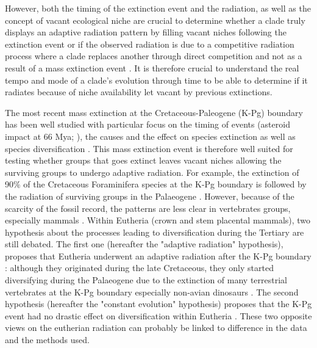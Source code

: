 \documentclass[12pt,letterpaper]{article}
\begin{document}
However, both the timing of the extinction event and the radiation, as well as the concept of vacant ecological niche are crucial to determine whether a clade truly displays an adaptive radiation pattern by filling vacant niches following the extinction event or if the observed radiation is due to a competitive radiation process where a clade replaces another through direct competition and not as a result of a mass extinction event \citep[e.g.][]{Brusatte12092008,bentonmodels2014}. It is therefore crucial to understand the real tempo and mode of a clade's evolution through time to be able to determine if it radiates because of niche availability let vacant by previous extinctions.

The most recent mass extinction at the Cretaceous-Paleogene (K-Pg) boundary has been well studied with particular focus on the timing of events (asteroid impact at 66 Mya; \citealt{rennetime2013}), the causes \citep[e.g.][]{rennetime2013,BRV:BRV12128} and the effect on species extinction \citep[e.g.][]{Erwin1998344,BRV:BRV12128} as well as species diversification \citep[e.g.][]{Stadler12042011,meredithimpacts2011,O'Leary08022013}. This mass extinction event is therefore well suited for testing whether groups that goes extinct leaves vacant niches allowing the surviving groups to undergo adaptive radiation. For example, the extinction of 90\% of the Cretaceous Foraminifera species at the K-Pg boundary is followed by the radiation of surviving groups in the Palaeogene \citep{D'Hondt01011996,Coxall01042006}. However, because of the scarcity of the fossil record, the patterns are less clear in vertebrates groups, especially mammals \citep[e.g.][]{meredithimpacts2011,O'Leary08022013}. Within Eutheria (crown and stem placental mammals), two hypothesis about the processes leading to diversification during the Tertiary are still debated. The first one (hereafter the "adaptive radiation" hypothesis), proposes that Eutheria underwent an adaptive radiation after the K-Pg boundary \citep{goswamia2011,MEE3:MEE312084,O'Leary08022013}: although they originated during the late Cretaceous, they only started diversifying during the Palaeogene due to the extinction of many terrestrial vertebrates at the K-Pg boundary especially non-avian dinosaurs \citep{BRV:BRV12128}. The second hypothesis (hereafter the "constant evolution" hypothesis) proposes that the K-Pg event had no drastic effect on diversification within Eutheria \citep{meredithimpacts2011,Stadler12042011,beckancient2014}. These two opposite views on the eutherian radiation can probably be linked to difference in the data and the methods used.
\end{document}
